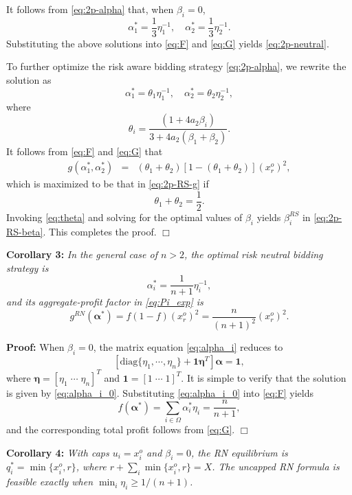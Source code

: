 \documentclass[journal]{IEEEtran}
\newcommand{\one}{\mathbf{1}}
\begin{document}
It follows from \eqref{eq:2p-alpha} that, when $\beta_i=0$,
\[ \alpha_1^* = \frac{1}{3}\eta_1^{-1}, \quad \alpha_2^* = \frac{1}{3}\eta_2^{-1}. \]
Substituting the above solutions into \eqref{eq:F} and \eqref{eq:G} yields \eqref{eq:2p-neutral}.

To further optimize the risk aware bidding strategy \eqref{eq:2p-alpha}, we rewrite the solution as
\[ \alpha_1^* = \theta_1 \eta_1^{-1}, \quad \alpha_2^* = \theta_2\eta_2^{-1}, \]
where 
\begin{equation}
    \theta_i = \frac{(1+4a_2\beta_i)}{3+4a_2(\beta_1+\beta_2)}. \label{eq:theta}
\end{equation} 
It follows from \eqref{eq:F} and \eqref{eq:G} that 
\begin{eqnarray*}
    g(\alpha_1^*, \alpha_2^*) & = & (\theta_1+\theta_2) [1- (\theta_1+\theta_2)] (x_r^o)^2, 
\end{eqnarray*}
which is maximized to be that in \eqref{eq:2p-RS-g} if
\[ \theta_1+\theta_2=\frac{1}{2}. \]
Invoking \eqref{eq:theta} and solving for the optimal values of $\beta_i$ yields $\beta_i^{RS}$ in \eqref{eq:2p-RS-beta}. This completes the proof. \hfill $\Box$

\noindent  \textbf{Corollary 3:} {\it In the general case of $n>2$, the optimal risk neutral bidding strategy is
\begin{equation}
    \alpha_i^* = \frac{1}{n+1}\eta_i^{-1},\label{eq:alpha_i_0} 
\end{equation} 
and its aggregate-profit factor in \eqref{eq:Pi_exp} is
\[ g^{RN}(\boldsymbol{\alpha}^*)=f(1-f)(x_r^o)^2=\frac{n}{(n+1)^2} (x_r^o)^2. \]}

\noindent \textbf{Proof:} When $\beta_i=0$, the matrix equation \eqref{eq:alpha_i} reduces to 
\[ \left[\mbox{diag}\{\eta_1,\cdots,\eta_n\} + \one \boldsymbol{\eta}^T \right] \boldsymbol{\alpha}=\one, \]
where $\boldsymbol{\eta}=[\eta_1 \; \cdots \; \eta_n]^T$ and $\one=[1 \; \cdots \; 1]^T$. It is simple to verify that the solution is given by \eqref{eq:alpha_i_0}. Substituting \eqref{eq:alpha_i_0} into \eqref{eq:F} yields 
\begin{equation}
f(\boldsymbol{\alpha}^*)=\sum_{i\in\Omega}\alpha_i^*\eta_i=\frac{n}{n+1}, \label{eq:f_RN_0}
\end{equation}
and the corresponding total profit follows from \eqref{eq:G}.  \hfill $\Box$


\noindent\textbf{Corollary 4:} \textit{With caps $u_i=x_i^o$ and $\beta_i=0$, the RN equilibrium is $q_i^*=\min\{x_i^o,r\}$, where $r+\sum_i\min\{x_i^o,r\}=X$. The uncapped RN formula is feasible exactly when $\min_i\eta_i\geq1/(n+1)$.}
\end{document}

